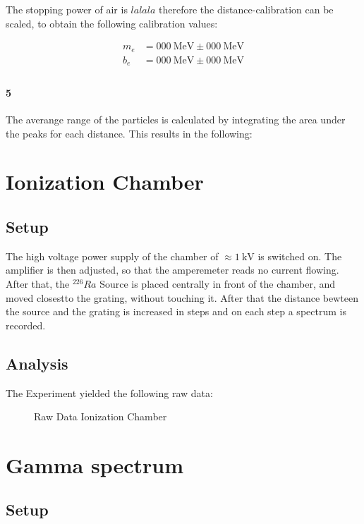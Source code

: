 \documentclass[12pt,twoside,a4paper]{scrartcl}
\begin{document}
				The stopping power of air is $lalala$ therefore the distance-calibration can be scaled, to obtain the following calibration values:

				\begin{align*}
					m_e &= \SI{000}{\mega \electronvolt} \pm \SI{000}{\mega \electronvolt} \\
					b_e &= \SI{000}{\mega \electronvolt} \pm \SI{000}{\mega \electronvolt} \\
				\end{align*}

			\paragraph{5}
				The averange range of the particles is calculated by integrating the area under the peaks for each distance.
				This results in the following:

\section{Ionization Chamber}

	\subsection{Setup}
		 The high voltage power supply of the chamber of $\approx \SI{1}{\kilo \volt}$ is switched on. The amplifier is then adjusted, so that the amperemeter reads no current flowing. After that, the $^{226}Ra$ Source is placed centrally in front of the chamber, and moved closestto the grating, without touching it. After that the distance bewteen the source and the grating is increased in steps and on each step a spectrum is recorded.

	\subsection{Analysis}

		The Experiment yielded the following raw data:

		\begin{figure}
			\caption{Raw Data Ionization Chamber}
		\end{figure}



\section{Gamma spectrum}
	\subsection{Setup}
\end{document}
